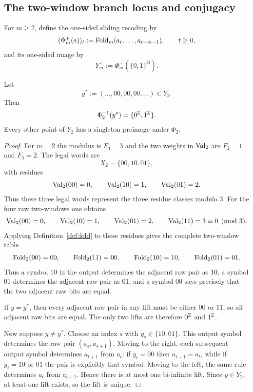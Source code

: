 ﻿\subsection{The two-window branch locus and conjugacy}
\label{sec:stab:branch-and-conjugacy}

For $m\ge2$, define the one-sided sliding recoding by
\[
(\Phi_m^+(a))_t:=\mathrm{Fold}_m(a_t,\ldots,a_{t+m-1}),\qquad t\ge0,
\]
and its one-sided image by
\[
Y_m^+:=\Phi_m^+(\{0,1\}^{\mathbb N}).
\]

\begin{theorem}\label{thm:m2-branch-locus}
Let
\[
y^\ast:=(\ldots,00,00,00,\ldots)\in Y_2.
\]
Then
\[
\Phi_2^{-1}(y^\ast)=\{0^{\mathbb{Z}},1^{\mathbb{Z}}\}.
\]
Every other point of $Y_2$ has a singleton preimage under $\Phi_2$.
\end{theorem}

\begin{proof}
For $m=2$ the modulus is $F_4=3$ and the two weights in $\mathrm{Val}_2$ are
$F_2=1$ and $F_3=2$.  The legal words are
\[
X_2=\{00,10,01\},
\]
with residues
\[
\mathrm{Val}_2(00)=0,\qquad \mathrm{Val}_2(10)=1,\qquad \mathrm{Val}_2(01)=2.
\]
Thus these three legal words represent the three residue classes modulo $3$.
For the four raw two-windows one obtains
\[
\mathrm{Val}_2(00)=0,\qquad
\mathrm{Val}_2(10)=1,\qquad
\mathrm{Val}_2(01)=2,\qquad
\mathrm{Val}_2(11)=3\equiv0\pmod3.
\]
Applying Definition~\ref{def:fold} to these residues gives the complete
two-window table
\[
\mathrm{Fold}_2(00)=00,\qquad \mathrm{Fold}_2(11)=00,\qquad
\mathrm{Fold}_2(10)=10,\qquad \mathrm{Fold}_2(01)=01.
\]
Thus a symbol $10$ in the output determines the adjacent raw pair as $10$, a
symbol $01$ determines the adjacent raw pair as $01$, and a symbol $00$ says
precisely that the two adjacent raw bits are equal.

If $y=y^\ast$, then every adjacent raw pair in any lift must be either $00$ or
$11$, so all adjacent raw bits are equal.  The only two lifts are therefore
$0^{\mathbb{Z}}$ and $1^{\mathbb{Z}}$.

Now suppose $y\ne y^\ast$.  Choose an index $s$ with
$y_s\in\{10,01\}$.  This output symbol determines the raw pair
$(a_s,a_{s+1})$.  Moving to the right, each subsequent output symbol determines
$a_{t+1}$ from $a_t$: if $y_t=00$ then $a_{t+1}=a_t$, while if
$y_t=10$ or $01$ the pair is explicitly that symbol.  Moving to the left,
the same rule determines $a_t$ from $a_{t+1}$.  Hence there is at most one
bi-infinite lift.  Since $y\in Y_2$, at least one lift exists, so the lift is
unique.
\end{proof}

